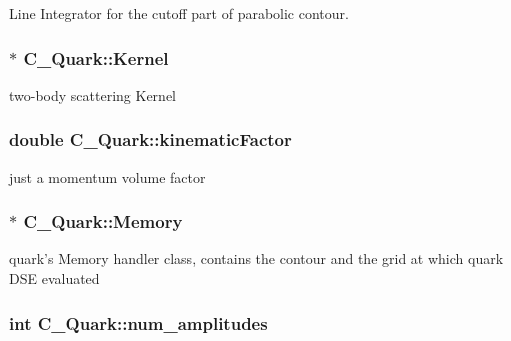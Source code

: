 Line Integrator for the cutoff part of parabolic contour. 

\hypertarget{class_c___quark_a825f0f4638fa87322db6af8335d6f05b}{
\subsubsection[{Kernel}]{$\ast$ C\-\_\-\-Quark\-::\-Kernel\hspace{0.3cm}{\ttfamily [protected]}}}\label{class_c___quark_a825f0f4638fa87322db6af8335d6f05b}


two-\/body scattering Kernel 

\hypertarget{class_c___quark_ad668099da3ad48b3adf1c2df771cb62c}{
\subsubsection[{kinematic\-Factor}]{\setlength{\rightskip}{0pt plus 5cm}double C\-\_\-\-Quark\-::kinematic\-Factor\hspace{0.3cm}{\ttfamily [protected]}}}\label{class_c___quark_ad668099da3ad48b3adf1c2df771cb62c}


just a momentum volume factor 

\hypertarget{class_c___quark_a9eb8b047110e9217c8dc615c9938566c}{
\subsubsection[{Memory}]{$\ast$ C\-\_\-\-Quark\-::\-Memory\hspace{0.3cm}{\ttfamily [protected]}}}\label{class_c___quark_a9eb8b047110e9217c8dc615c9938566c}


quark's Memory handler class, contains the contour and the grid at which quark D\-S\-E evaluated 

\hypertarget{class_c___quark_a9b47aa812f3e3abf90acfb570ae51617}{
\subsubsection[{num\-\_\-amplitudes}]{\setlength{\rightskip}{0pt plus 5cm}int C\-\_\-\-Quark\-::num\-\_\-amplitudes\hspace{0.3cm}{\ttfamily [protected]}}}\label{class_c___quark_a9b47aa812f3e3abf90acfb570ae51617}


